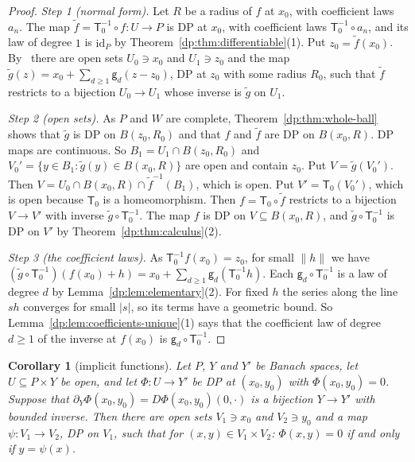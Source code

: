 \documentclass[11pt]{amsart}
\newtheorem{corollary}[theorem]{Corollary}
\theoremstyle{definition}
\theoremstyle{remark}
\numberwithin{equation}{section}
\newcommand{\id}{\mathrm{id}}
\newcommand{\abs}[1]{\lvert #1\rvert}
\newcommand{\norm}[1]{\lVert #1\rVert}
\theoremstyle{plain}
\theoremstyle{definition}
\theoremstyle{plain}
\begin{document}
\begin{proof}
\emph{Step 1 (normal form).} Let $R$ be a radius of $f$ at $x_0$, with coefficient laws $a_n$. The map $\tilde f=\mathsf T_0^{-1}\circ f\colon U\to P$ is DP at $x_0$, with coefficient laws $\mathsf T_0^{-1}\circ a_n$, and its law of degree $1$ is $\id_P$ by Theorem~\ref{dp:thm:differentiable}(1). Put $z_0=\tilde f(x_0)$. By~\cite[Lemma~Q.14]{I} there are open sets $U_0\ni x_0$ and $U_1\ni z_0$ and the map $\tilde g(z)=x_0+\sum_{d\ge1}\mathsf g_d(z-z_0)$, DP at $z_0$ with some radius $R_0$, such that $\tilde f$ restricts to a bijection $U_0\to U_1$ whose inverse is $\tilde g$ on $U_1$.

\emph{Step 2 (open sets).} As $P$ and $W$ are complete, Theorem~\ref{dp:thm:whole-ball} shows that $\tilde g$ is DP on $B(z_0,R_0)$ and that $f$ and $\tilde f$ are DP on $B(x_0,R)$. DP maps are continuous. So $B_1=U_1\cap B(z_0,R_0)$ and $V_0'=\{y\in B_1:\tilde g(y)\in B(x_0,R)\}$ are open and contain $z_0$. Put $V=\tilde g(V_0')$. Then $V=U_0\cap B(x_0,R)\cap\tilde f^{-1}(B_1)$, which is open. Put $V'=\mathsf T_0(V_0')$, which is open because $\mathsf T_0$ is a homeomorphism. Then $f=\mathsf T_0\circ\tilde f$ restricts to a bijection $V\to V'$ with inverse $\tilde g\circ\mathsf T_0^{-1}$. The map $f$ is DP on $V\subseteq B(x_0,R)$, and $\tilde g\circ\mathsf T_0^{-1}$ is DP on $V'$ by Theorem~\ref{dp:thm:calculus}(2).

\emph{Step 3 (the coefficient laws).} As $\mathsf T_0^{-1}f(x_0)=z_0$, for small $\norm h$ we have $(\tilde g\circ\mathsf T_0^{-1})(f(x_0)+h)=x_0+\sum_{d\ge1}\mathsf g_d(\mathsf T_0^{-1}h)$. Each $\mathsf g_d\circ\mathsf T_0^{-1}$ is a law of degree $d$ by Lemma~\ref{dp:lem:elementary}(2). For fixed $h$ the series along the line $sh$ converges for small $\abs s$, so its terms have a geometric bound. So Lemma~\ref{dp:lem:coefficients-unique}(1) says that the coefficient law of degree $d\ge1$ of the inverse at $f(x_0)$ is $\mathsf g_d\circ\mathsf T_0^{-1}$.
\end{proof}

\begin{corollary}[implicit functions]\label{dp:cor:implicit}
Let $P$, $Y$ and $Y'$ be Banach spaces, let $U\subseteq P\times Y$ be open, and let $\Phi\colon U\to Y'$ be DP at $(x_0,y_0)$ with $\Phi(x_0,y_0)=0$. Suppose that $\partial_Y\Phi(x_0,y_0)=D\Phi(x_0,y_0)(0,\cdot)$ is a bijection $Y\to Y'$ with bounded inverse. Then there are open sets $V_1\ni x_0$ and $V_2\ni y_0$ and a map $\psi\colon V_1\to V_2$, DP on $V_1$, such that for $(x,y)\in V_1\times V_2$: $\Phi(x,y)=0$ if and only if $y=\psi(x)$.
\end{corollary}
\end{document}
